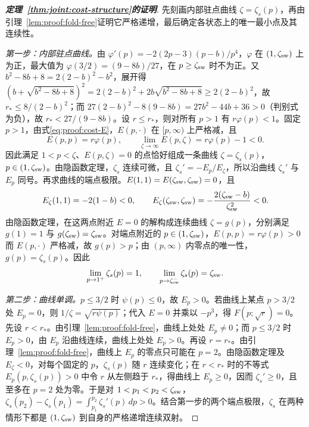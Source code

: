 \begin{proof}[\normalfont\bfseries 定理~\ref{thm:joint:cost-structure}的证明]
先刻画内部驻点曲线 $\zeta=\zeta_s(p)$，再由引理~\ref{lem:proof:fold-free}证明它严格递增，最后确定各状态上的唯一最小点及其连续性。

\emph{第一步：内部驻点曲线。}由 $\varphi'(p)=-2(2p-3)(p-b)/p^4$，$\varphi$ 在 $(1,\zeta_{\rm sw})$ 上为正，最大值为 $\varphi(3/2)=(9-8b)/27$，在 $p\ge\zeta_{\rm sw}$ 时不为正。又 $b^2-8b+8=2(2-b)^2-b^2$，展开得 $(b+\sqrt{b^2-8b+8})^2=2(2-b)^2+2b\sqrt{b^2-8b+8}\ge2(2-b)^2$，故 $r_*\le8/(2-b)^2$；而 $27(2-b)^2-8(9-8b)=27b^2-44b+36>0$（判别式为负），故 $r_*<27/(9-8b)$。设 $r\le r_*$，则对所有 $p>1$ 有 $r\varphi(p)<1$。固定 $p>1$，由式\eqref{eq:proof:cost-E}，$E(p,\cdot)$ 在 $[p,\infty)$ 上严格减，且
\[
E(p,p)=r\varphi(p),\qquad
\lim_{\zeta\to\infty}E(p,\zeta)=r\varphi(p)-1<0.
\]
因此满足 $1<p<\zeta$、$E(p,\zeta)=0$ 的点恰好组成一条曲线 $\zeta=\zeta_s(p)$，$p\in(1,\zeta_{\rm sw})$。由隐函数定理，$\zeta_s$ 连续可微，且 $\zeta_s'=-E_p/E_\zeta$，所以沿曲线 $\zeta_s'$ 与 $E_p$ 同号。再求曲线的端点极限。$E(1,1)=E(\zeta_{\rm sw},\zeta_{\rm sw})=0$，且
\[
E_\zeta(1,1)=-2(1-b)<0,\qquad
E_\zeta(\zeta_{\rm sw},\zeta_{\rm sw})=-\frac{2(\zeta_{\rm sw}-b)}{\zeta_{\rm sw}^2}<0.
\]
由隐函数定理，在这两点附近 $E=0$ 的解构成连续曲线 $\zeta=g(p)$，分别满足 $g(1)=1$ 与 $g(\zeta_{\rm sw})=\zeta_{\rm sw}$。对端点附近的 $p\in(1,\zeta_{\rm sw})$，$E(p,p)=r\varphi(p)>0$ 而 $E(p,\cdot)$ 严格减，故 $g(p)>p$；由 $(p,\infty)$ 内零点的唯一性，$g(p)=\zeta_s(p)$。因此
\[
\lim_{p\to1^{+}}\zeta_s(p)=1,\qquad
\lim_{p\to\zeta_{\rm sw}^{-}}\zeta_s(p)=\zeta_{\rm sw}.
\]

\emph{第二步：曲线单调。}$p\le3/2$ 时 $\psi(p)\le0$，故 $E_p>0$。若曲线上某点 $p>3/2$ 处 $E_p=0$，则 $1/\zeta=\sqrt{r\psi(p)}$；代入 $E=0$ 并乘以 $-p^3$，得 $F(p;\sqrt r)=0$。先设 $r<r_*$。由引理~\ref{lem:proof:fold-free}，曲线上处处 $E_p\ne0$；而 $p\le3/2$ 时 $E_p>0$，由 $E_p$ 沿曲线连续，曲线上处处 $E_p>0$。再设 $r=r_*$。由引理~\ref{lem:proof:fold-free}，曲线上 $E_p$ 的零点只可能在 $p=2$。由隐函数定理及 $E_\zeta<0$，对每个固定的 $p$，$\zeta_s(p)$ 随 $r$ 连续变化；在 $r<r_*$ 时的不等式 $E_p(p,\zeta_s(p))>0$ 中令 $r$ 从左侧趋于 $r_*$，得曲线上 $E_p\ge0$，因而 $\zeta_s'\ge0$，且至多在 $p=2$ 处为零。于是对 $1<p_1<p_2<\zeta_{\rm sw}$，$\zeta_s(p_2)-\zeta_s(p_1)=\int_{p_1}^{p_2}\zeta_s'(p)\,dp>0$。结合第一步的两个端点极限，$\zeta_s$ 在两种情形下都是 $(1,\zeta_{\rm sw})$ 到自身的严格递增连续双射。


\end{proof}
